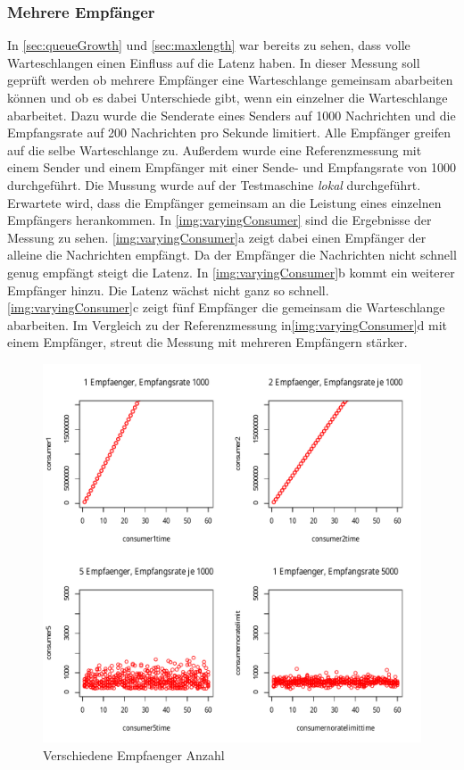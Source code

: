 \subsubsection{Mehrere Empfänger}
In \autoref{sec:queueGrowth} und \autoref{sec:maxlength} war bereits zu sehen, dass volle Warteschlangen einen Einfluss auf die Latenz haben. In dieser Messung soll geprüft werden ob mehrere Empfänger eine Warteschlange gemeinsam abarbeiten können und ob es dabei Unterschiede gibt, wenn ein einzelner die Warteschlange abarbeitet. Dazu wurde die Senderate eines Senders auf 1000 Nachrichten und die Empfangsrate auf 200 Nachrichten pro Sekunde limitiert. Alle Empfänger greifen auf die selbe Warteschlange zu. Außerdem wurde eine Referenzmessung mit einem Sender und einem Empfänger mit einer Sende- und Empfangsrate von 1000 durchgeführt. Die Mussung wurde auf der Testmaschine \textit{lokal} durchgeführt. Erwartete wird, dass die Empfänger gemeinsam an die Leistung eines einzelnen Empfängers herankommen.
In \autoref{img:varyingConsumer} sind die Ergebnisse der Messung zu sehen. \autoref{img:varyingConsumer}a zeigt dabei einen Empfänger der alleine die Nachrichten empfängt. Da der Empfänger die Nachrichten nicht schnell genug empfängt steigt die Latenz. In \autoref{img:varyingConsumer}b kommt ein weiterer Empfänger hinzu. Die Latenz wächst nicht ganz so schnell. \autoref{img:varyingConsumer}c zeigt fünf Empfänger die gemeinsam die Warteschlange abarbeiten. Im Vergleich zu der Referenzmessung in\autoref{img:varyingConsumer}d mit einem Empfänger, streut die Messung mit mehreren Empfängern stärker.
\begin{figure}
\center
  \includegraphics[width=1\textwidth]{images/measurement/varying-consumer.pdf}
  \caption{Verschiedene Empfaenger Anzahl}
  \label{img:varyingConsumer}
\end{figure}
